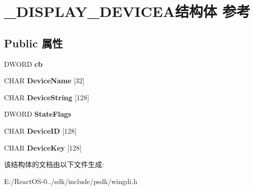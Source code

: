 \hypertarget{struct___d_i_s_p_l_a_y___d_e_v_i_c_e_a}{}\section{\+\_\+\+D\+I\+S\+P\+L\+A\+Y\+\_\+\+D\+E\+V\+I\+C\+E\+A结构体 参考}
\label{struct___d_i_s_p_l_a_y___d_e_v_i_c_e_a}
\subsection*{Public 属性}
\begin{DoxyCompactItemize}
\item 
\mbox{\label{struct___d_i_s_p_l_a_y___d_e_v_i_c_e_a_a1eb65880993d9021b739546e67b62172}} 
D\+W\+O\+RD {\bfseries cb}
\item 
\mbox{\label{struct___d_i_s_p_l_a_y___d_e_v_i_c_e_a_ac056af2583358121ab128ea5fb9b3ffb}} 
C\+H\+AR {\bfseries Device\+Name} \mbox{[}32\mbox{]}
\item 
\mbox{\label{struct___d_i_s_p_l_a_y___d_e_v_i_c_e_a_a96c435b5a458ed38ff8e41d1e3937823}} 
C\+H\+AR {\bfseries Device\+String} \mbox{[}128\mbox{]}
\item 
\mbox{\label{struct___d_i_s_p_l_a_y___d_e_v_i_c_e_a_a5b40492f69e767e0302ca5a77aa100e3}} 
D\+W\+O\+RD {\bfseries State\+Flags}
\item 
\mbox{\label{struct___d_i_s_p_l_a_y___d_e_v_i_c_e_a_af5c726369c90ee90e7ae09d62d2769ed}} 
C\+H\+AR {\bfseries Device\+ID} \mbox{[}128\mbox{]}
\item 
\mbox{\label{struct___d_i_s_p_l_a_y___d_e_v_i_c_e_a_afa23b61b65360a75d2ede7d6ef73f4fe}} 
C\+H\+AR {\bfseries Device\+Key} \mbox{[}128\mbox{]}
\end{DoxyCompactItemize}


该结构体的文档由以下文件生成\+:\begin{DoxyCompactItemize}
\item 
E\+:/\+React\+O\+S-\/0../sdk/include/psdk/wingdi.\+h\end{DoxyCompactItemize}
